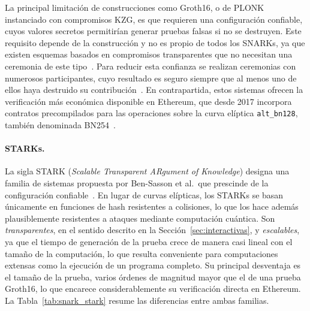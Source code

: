 La principal limitación de construcciones como Groth16, o de PLONK instanciado con compromisos
KZG, es que requieren una configuración confiable, cuyos valores secretos permitirían generar
pruebas falsas si no se destruyen. Este requisito depende de la construcción y no es propio de
todos los SNARKs, ya que existen esquemas basados en compromisos transparentes que no necesitan
una ceremonia de este tipo~\cite{thaler2022proofs}. Para reducir esta
confianza se realizan ceremonias con numerosos participantes, cuyo resultado es seguro siempre
que al menos uno de ellos haya destruido su contribución~\cite{bowe2017scalable}. En contrapartida, estos sistemas ofrecen la
verificación más económica disponible en Ethereum, que desde 2017 incorpora contratos
precompilados para las operaciones sobre la curva elíptica \texttt{alt\_bn128}, también
denominada BN254~\cite{eip196, eip197}.

\paragraph{STARKs.} La sigla STARK (\textit{Scalable Transparent ARgument of Knowledge})
designa una familia de sistemas propuesta por Ben-Sasson et al.\ que prescinde de la
configuración confiable~\cite{bensasson2018scalable}. En lugar de curvas elípticas, los STARKs
se basan únicamente en funciones de hash resistentes a colisiones, lo que los hace además
plausiblemente resistentes a ataques mediante computación cuántica. Son
\textit{transparentes}, en el sentido descrito en la Sección~\ref{sec:interactivas}, y
\textit{escalables}, ya que el tiempo de generación de la prueba crece de manera casi lineal con
el tamaño de la computación, lo que resulta conveniente para computaciones extensas como la ejecución de un
programa completo. Su principal desventaja es el tamaño de la prueba, varios órdenes de magnitud
mayor que el de una prueba Groth16, lo que encarece considerablemente su verificación directa en
Ethereum. La Tabla~\ref{tab:snark_stark} resume las diferencias entre ambas familias.

